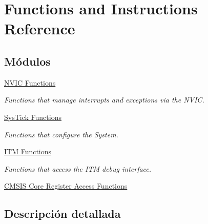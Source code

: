 \hypertarget{group___c_m_s_i_s___core___function_interface}{}\section{Functions and Instructions Reference}
\label{group___c_m_s_i_s___core___function_interface}
\subsection*{Módulos}
\begin{DoxyCompactItemize}
\item 
\hyperlink{group___c_m_s_i_s___core___n_v_i_c_functions}{N\+V\+I\+C Functions}
\begin{DoxyCompactList}\small\item\em Functions that manage interrupts and exceptions via the N\+V\+IC. \end{DoxyCompactList}\item 
\hyperlink{group___c_m_s_i_s___core___sys_tick_functions}{Sys\+Tick Functions}
\begin{DoxyCompactList}\small\item\em Functions that configure the System. \end{DoxyCompactList}\item 
\hyperlink{group___c_m_s_i_s__core___debug_functions}{I\+T\+M Functions}
\begin{DoxyCompactList}\small\item\em Functions that access the I\+TM debug interface. \end{DoxyCompactList}\item 
\hyperlink{group___c_m_s_i_s___core___reg_acc_functions}{C\+M\+S\+I\+S Core Register Access Functions}
\end{DoxyCompactItemize}


\subsection{Descripción detallada}
